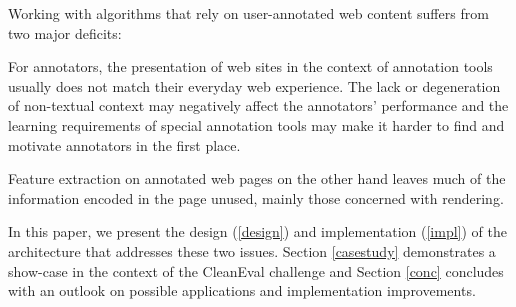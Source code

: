 Working with algorithms that rely on user-annotated web content suffers from two major deficits:

For annotators, the presentation of web sites in the context of annotation tools usually does not match their everyday web experience.
The lack or degeneration of non-textual context may negatively affect the annotators' performance
and the learning requirements of special annotation tools may make it harder to find and motivate annotators in the first place.

Feature extraction on annotated web pages on the other hand leaves much of the information encoded in the page unused,
mainly those concerned with rendering.

In this paper, we present the design (\ref{design}) and implementation (\ref{impl}) of the {\KrdWrd} architecture that addresses these two issues.
Section \ref{casestudy} demonstrates a show-case in the context of the CleanEval challenge and Section \ref{conc} concludes with an outlook on possible applications and implementation improvements.
